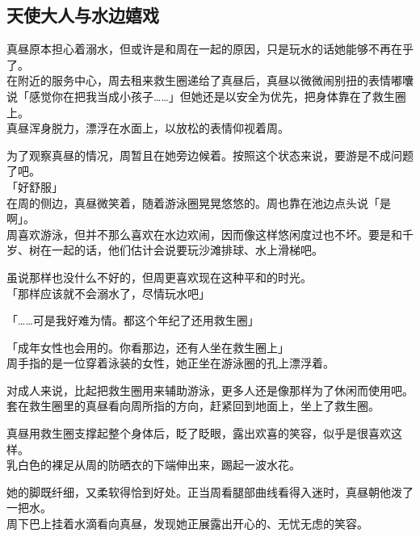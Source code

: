 \subsection{天使大人与水边嬉戏}

真昼原本担心着溺水，但或许是和周在一起的原因，只是玩水的话她能够不再在乎了。\\

在附近的服务中心，周去租来救生圈递给了真昼后，真昼以微微闹别扭的表情嘟囔说「感觉你在把我当成小孩子……」但她还是以安全为优先，把身体靠在了救生圈上。\\

真昼浑身脱力，漂浮在水面上，以放松的表情仰视着周。

为了观察真昼的情况，周暂且在她旁边候着。按照这个状态来说，要游是不成问题了吧。\\

「好舒服」\\

在周的侧边，真昼微笑着，随着游泳圈晃晃悠悠的。周也靠在池边点头说「是啊」。\\

周喜欢游泳，但并不那么喜欢在水边欢闹，因而像这样悠闲度过也不坏。要是和千岁、树在一起的话，他们估计会说要玩沙滩排球、水上滑梯吧。

虽说那样也没什么不好的，但周更喜欢现在这种平和的时光。\\

「那样应该就不会溺水了，尽情玩水吧」

「……可是我好难为情。都这个年纪了还用救生圈」

「成年女性也会用的。你看那边，还有人坐在救生圈上」\\

周手指的是一位穿着泳装的女性，她正坐在游泳圈的孔上漂浮着。

对成人来说，比起把救生圈用来辅助游泳，更多人还是像那样为了休闲而使用吧。\\

套在救生圈里的真昼看向周所指的方向，赶紧回到地面上，坐上了救生圈。

真昼用救生圈支撑起整个身体后，眨了眨眼，露出欢喜的笑容，似乎是很喜欢这样。\\

乳白色的裸足从周的防晒衣的下端伸出来，踢起一波水花。

她的脚既纤细，又柔软得恰到好处。正当周看腿部曲线看得入迷时，真昼朝他泼了一把水。\\

周下巴上挂着水滴看向真昼，发现她正展露出开心的、无忧无虑的笑容。\\

